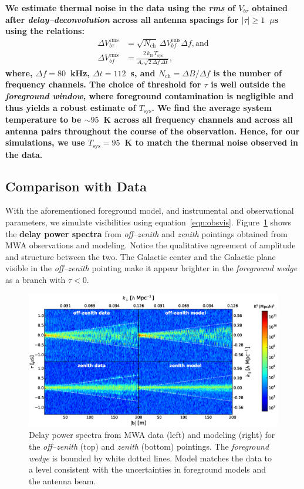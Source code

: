 \documentclass[preprint2,iop,numberedappendix,twocolappendix,appendixfloats]{emulateapj}
\begin{document}
{\bf We estimate thermal noise in the data using the {\it rms} of $V_{b\tau}$ obtained after {\it delay--deconvolution} across all antenna spacings for $|\tau| \geq 1$~$\mu$s using the relations:
\begin{align}\label{eqn:Tsys}
  \Delta V_{b\tau}^\textrm{rms} &= \sqrt{N_\textrm{ch}}\,\Delta V_{bf}^\textrm{rms} \Delta f, \textrm{and} \\
  \Delta V_{bf}^\textrm{rms} &= \frac{2\,k_\textrm{B}\,T_\textrm{sys}}{A_\textrm{e}\sqrt{2\,\Delta f\,\Delta t}},
\end{align}
where, $\Delta f = 80$~kHz, $\Delta t = 112$~s, and $N_\textrm{ch}=\Delta B/\Delta f$ is the number of frequency channels. The choice of threshold for $\tau$ is well outside the {\it foreground window}, where foreground contamination is negligible and thus yields a robust estimate of $T_\textrm{sys}$. We find the average system temperature to be $\sim 95$~K across all frequency channels and across all antenna pairs throughout the course of the observation. Hence, for our simulations, we use $T_\textrm{sys}=95$~K to match the thermal noise observed in the data.} 

\subsection{Comparison with Data}\label{sec:data-vs-model}

With the aforementioned foreground model, and instrumental and observational parameters, we simulate visibilities using equation~\ref{eqn:obsvis}. Figure~\ref{fig:fhd-sim-comparison} shows the {\bf delay power spectra} from {\it off--zenith} and {\it zenith} pointings obtained from MWA observations and modeling. Notice the qualitative agreement of amplitude and structure between the two. The Galactic center and the Galactic plane visible in the {\it off--zenith} pointing make it appear brighter in the {\it foreground wedge} as a branch with $\tau<0$. 

\begin{figure}[htb]
\centering
\includegraphics[width=\linewidth]{figure6.eps}
\caption{Delay power spectra from MWA data (left) and modeling (right) for the {\it off--zenith} (top) and {\it zenith} (bottom) pointings. The {\it foreground wedge} is bounded by white dotted lines. Model matches the data to a level consistent with the uncertainties in foreground models and the antenna beam. \label{fig:fhd-sim-comparison}}
\end{figure}
\end{document}
